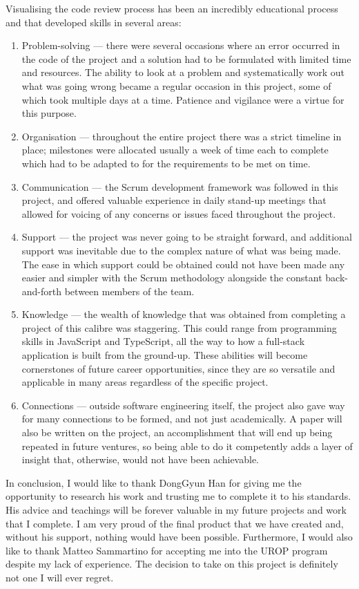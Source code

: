 Visualising the code review process has been an incredibly educational process and that developed skills in several areas:

\begin{enumerate}
    \item Problem-solving —
    there were several occasions where an error occurred in the code of the project and a solution had
    to be formulated with limited time and resources.
    The ability to look at a problem
    and systematically work out what was going wrong became a regular occasion in this project,
    some of which took multiple days at a time.
    Patience and vigilance were a virtue for this purpose.
    \item Organisation — throughout the entire project there was a strict timeline in place;
    milestones were allocated usually a week of time each to complete
    which had to be adapted to for the requirements to be met on time.
    \item Communication — the Scrum development framework was followed in this project,
    and offered valuable experience in daily stand-up meetings
    that allowed for voicing of any concerns or issues faced throughout the project.
    \item Support — the project was never going to be straight forward,
    and additional support was inevitable due to the complex nature of what was being made.
    The ease
    in which support could be obtained could not have been made any easier and simpler with the Scrum methodology alongside the constant back-and-forth between members of the team.
    \item Knowledge — the wealth of knowledge that was obtained from completing a project of this calibre was staggering.
    This could range from programming skills in JavaScript and TypeScript,
    all the way to how a full-stack application is built from the ground-up.
    These abilities will become cornerstones of future career opportunities,
    since they are so versatile and applicable in many areas regardless of the specific project.
    \item Connections — outside software engineering itself,
    the project also gave way for many connections to be formed, and not just academically.
    A paper will also be written on the project,
    an accomplishment
    that will end up being repeated in future ventures,
    so being able to do it competently adds a layer of insight that,
    otherwise, would not have been achievable.
\end{enumerate}

In conclusion,
I would like to thank DongGyun Han
for giving me the opportunity to research his work and trusting me to complete it to his standards.
His advice and teachings will be forever valuable in my future projects and work that I complete.
I am very proud of the final product that we have created and, without his support, nothing would have been possible.
Furthermore,
I would also like to thank Matteo Sammartino for accepting me into the UROP program despite my lack of experience.
The decision to take on this project is definitely not one I will ever regret.